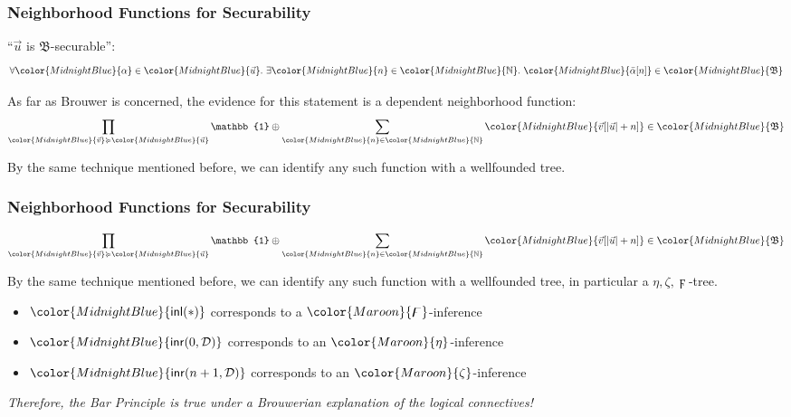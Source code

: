 \documentclass[10pt]{beamer}
\def\InputModeColorName{MidnightBlue}
\def\OutputModeColorName{Maroon}
\newcommand\IMode[1]{{\color{\InputModeColorName}{#1}}}
\newcommand\OMode[1]{{\color{\OutputModeColorName}{#1}}}
\newcommand\Member[2]{\IMode{#1}\in \IMode{#2}}
\newcommand\Nat{\mathbb{N}}
\begin{document}
\begin{frame}
  \frametitle{Neighborhood Functions for Securability}

  ``$\vec{u}$ is $\mathfrak{B}$-securable'':
  \[
    \forall \Member{\alpha}{\vec{u}}.\
    \exists \Member{n}{\Nat}.\
    \Member{\bar{\alpha}[n]}{\mathfrak{B}}
  \]

  \medskip
  \pause

  As far as Brouwer is concerned, the evidence for this statement is a
  dependent \alert{neighborhood function}:
  \[
    \prod_{\IMode{\vec{v}}\succcurlyeq\IMode{\vec{u}}}
    \mathbb{1}
    \oplus
    \sum_{\Member{n}{\Nat}}
    \Member{\vec{v}[\vert\vec{u}\vert + n]}{\mathfrak{B}}
  \]

  By the same technique mentioned before, we can identify any such function
  with a wellfounded tree.
\end{frame}

\begin{frame}
  \frametitle{Neighborhood Functions for Securability}
  \[
    \prod_{\IMode{\vec{v}}\succcurlyeq\IMode{\vec{u}}}
    \mathbb{1}
    \oplus
    \sum_{\Member{n}{\Nat}}
    \Member{\vec{v}[\vert\vec{u}\vert + n]}{\mathfrak{B}}
  \]

  By the same technique mentioned before, we can identify any such function
  with a wellfounded tree, in particular a $\eta,\zeta,\digamma$-tree.
  \pause

  \begin{itemize}
    \item $\IMode{\mathsf{inl}(*)}$ corresponds to a $\OMode{\digamma}$-inference
      \pause

    \item $\IMode{\mathsf{inr}(0,\mathcal{D})}$ corresponds to an $\OMode{\eta}$-inference
      \pause
    \item $\IMode{\mathsf{inr}(n+1,\mathcal{D})}$ corresponds to an $\OMode{\zeta}$-inference
  \end{itemize}

  \medskip
  \pause

  \alert{%
    \emph{%
      Therefore, the Bar Principle is true under a Brouwerian explanation of the
      logical connectives!
    }
  }
\end{frame}
\end{document}
